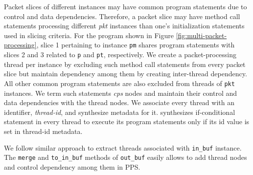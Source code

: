 \documentclass[letterpaper,twocolumn,10pt]{article}
\begin{document}
Packet slices of different instances may have common program statements due to control and data dependencies.
Therefore, a packet slice may have method call statements processing different \emph{pkt} instances than one's initialization statements used in slicing criteria.
For the program shown in Figure \ref{fig:multi-packet-processing}, slice 1 pertaining to instance \texttt{pm} shares program statements with slices 2 and 3 related to \texttt{p} and \texttt{pt}, respectively.
We create a packet-processing thread per instance by excluding such method call statements from every packet slice but maintain dependency among them by creating inter-thread dependency.
All other common program statements are also excluded from threads of \texttt{pkt} instances.
We term such statements \emph{cps} nodes and maintain their control and data dependencies with the thread nodes.
We associate every thread with an identifier, \emph{thread-id}, and synthesize metadata for it.
\ucomp synthesizes if-conditional statement in every thread to execute its program statements only if its id value is set in thread-id metadata.



We follow similar approach to extract threads associated with \texttt{in\_buf} instance.
The \texttt{merge} and \texttt{to\_in\_buf} methods of \texttt{out\_buf} easily allows to add thread nodes and control dependency among them in PPS.
\end{document}
